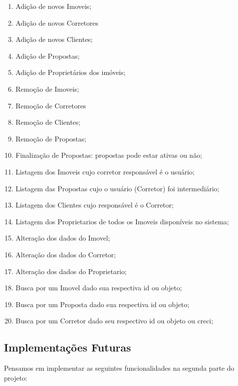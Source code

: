 \documentclass[a4paper,11pt,fleqn]{article}
\begin{document}
\begin{enumerate}
    \item Adição de novos Imoveis;
    \item Adição de novos Corretores
    \item Adição de novos Clientes;
    \item Adição de Propostas;
    \item Adição de Proprietários dos imóveis;
    \item Remoção de Imoveis;
    \item Remoção de Corretores
    \item Remoção de Clientes;
    \item Remoção de Propostas;
    \item Finalização de Propostas: propostas pode estar ativas ou não;
    \item Listagem dos Imoveis cujo corretor responsável é o usuário;
    \item Listagem das Propostas cujo o usuário (Corretor) foi intermediário;
    \item Listagem dos Clientes cujo responsável é o Corretor;
    \item Listagem dos Proprietarios de todos os Imoveis disponíveis no sistema;
    \item Alteração dos dados do Imovel;
    \item Alteração dos dados do Corretor;
    \item Alteração dos dados do Proprietario;
    \item Busca por um Imovel dado sua respectiva id ou objeto;
    \item Busca por um Proposta dado sua respectiva id ou objeto;
    \item Busca por um Corretor dado seu respectivo id ou objeto ou creci;
\end{enumerate}

\subsection{Implementações Futuras}
\label{ss:func-faltando}

Pensamos em implementar as seguintes funcionalidades na segunda parte do projeto:
\end{document}
